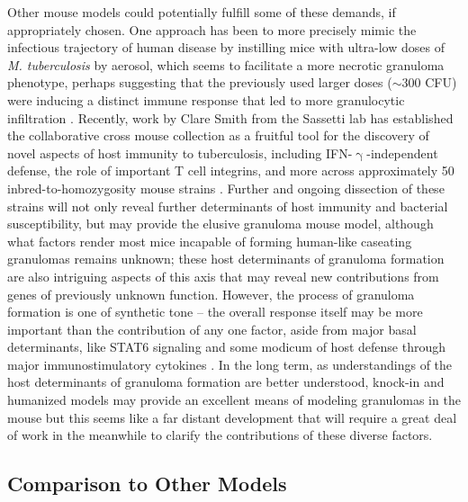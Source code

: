 Other mouse models could potentially fulfill some of these demands, if appropriately chosen. One approach has been to more precisely mimic the infectious trajectory of human disease by instilling mice with ultra\hyp{}low doses of \textit{M. tuberculosis} by aerosol, which seems to facilitate a more necrotic granuloma phenotype, perhaps suggesting that the previously used larger doses (${\sim}$300 CFU) were inducing a distinct immune response that led to more granulocytic infiltration \citep{Plumlee2021}. Recently, work by Clare Smith from the Sassetti lab has established the collaborative cross mouse collection as a fruitful tool for the discovery of novel aspects of host immunity to tuberculosis, including IFN\hyp{}$\upgamma$\hyp{}independent defense, the role of important T cell integrins, and more across approximately 50 inbred\hyp{}to\hyp{}homozygosity mouse strains \citep{Smith2016, Smith2022}. Further and ongoing dissection of these strains will not only reveal further determinants of host immunity and bacterial susceptibility, but may provide the elusive granuloma mouse model, although what factors render most mice incapable of forming human\hyp{}like caseating granulomas remains unknown; these host determinants of granuloma formation are also intriguing aspects of this axis that may reveal new contributions from genes of previously unknown function. However, the process of granuloma formation is one of synthetic tone -- the overall response itself may be more important than the contribution of any one factor, aside from major basal determinants, like STAT6 signaling \citep{Cronan2021} and some modicum of host defense through major immunostimulatory cytokines \citep{Flynn1993, Flynn1995}. In the long term, as understandings of the host determinants of granuloma formation are better understood, knock\hyp{}in and humanized models may provide an excellent means of modeling granulomas in the mouse but this seems like a far distant development that will require a great deal of work in the meanwhile to clarify the contributions of these diverse factors.

\subsection{Comparison to Other Models}\label{zfcomp}

